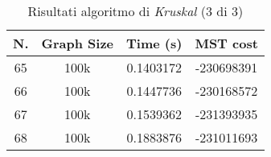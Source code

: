\begin{table}[H]
	\centering
	\begin{tabular}{|c|c|c|c|}
		\hline
		\textbf{N.} & \textbf{Graph Size} & \textbf{Time (s)} & \textbf{MST cost}\\
		\hline
		65 & 100k & 0.1403172 & -230698391\\
		\hline
		66 & 100k & 0.1447736 & -230168572\\
		\hline
		67 & 100k & 0.1539362 & -231393935\\
		\hline
		68 & 100k & 0.1883876 & -231011693\\
		\hline
	\end{tabular}
\caption{Risultati algoritmo di \textit{Kruskal} (3 di 3)}
\end{table}